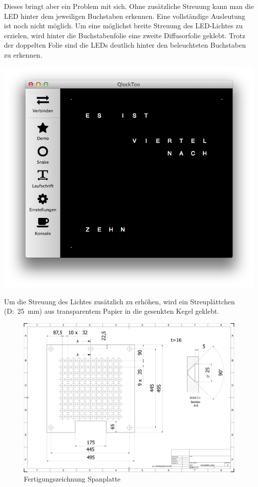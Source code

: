 \begin{multicols}{2}
Dieses bringt aber ein Problem mit sich. Ohne zusätzliche Streuung kann man die LED hinter dem jeweiligen Buchstaben erkennen. Eine vollständige Ausleutung ist noch nicht möglich. Um eine möglichst breite Streuung des LED-Lichtes zu erzielen, wird hinter die Buchstabenfolie eine zweite Diffusorfolie geklebt. Trotz der doppelten Folie sind die LEDs deutlich hinter den beleuchteten Buchstaben zu erkennen.

\includegraphics[width=0.9\columnwidth]{Abbildungen/Software/Manager} %

Um die Streuung des Lichtes zusätzlich zu erhöhen, wird ein Streuplättchen (D:~25~mm) aus transparentem Papier in die gesenkten Kegel geklebt. 

\end{multicols}

\begin{landscape}
	\begin{figure}
		\centering
		\includegraphics[width=21cm]{Abbildungen/Konstruktion/Grundplatte}
		\caption[Spanplatte]{Fertigungszeichnung Spanplatte}
		\label{fig:Spanplatte}
	\end{figure}
\end{landscape}


